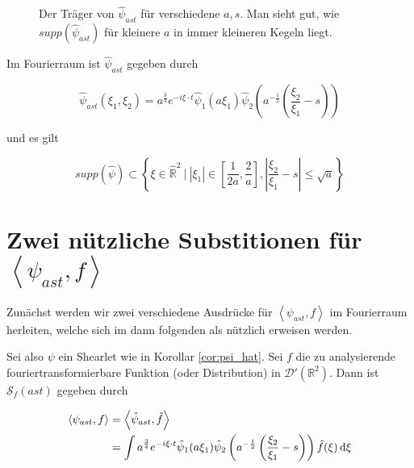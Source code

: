 \begin{remark}

\begin{figure}[h]
\centering

\label{fig:supp_psi_hat}
\caption{Der Träger von $\hat \psi_{ast}$ für verschiedene $a, s$. Man sieht gut,
wie $supp (\hat \psi_{ast})$ für kleinere $a$ in immer kleineren Kegeln liegt.}
\end{figure}

\label{cor:psi_hat}
Im Fourierraum ist $\hat{\psi}_{ast}$ gegeben durch

\begin{equation}
    \hat \psi_{ast}{(\xi_1, \xi_2)} = a^{\frac{3}{4}}e^{-i\xi \cdot t}\hat\psi_1(a \xi_1) \hat\psi_{2}\left(a^{-\frac{1}{2}}\left(\frac{\xi_2}{\xi_1}-s\right)\right)
\end{equation}

und es gilt

\begin{equation}
\label{eq:supp_psi}
    supp(\hat \psi) \subset \left\{\xi \in  \hat{\mathbb{R}}^2 ~\Big| ~|\xi_1| \in \left[\frac{1}{2 a} , \frac{2}{a}\right], \left|\frac{\xi_2}{\xi_1} - s\right| \leq \sqrt{a} \right\}
\end{equation}

\end{remark}





\section{\texorpdfstring{Zwei nützliche Substitionen für  $\left<\psi_{ast}, f\right>$}{zwei nützliche Substitutionen}}
\label{sec:substitutionen}

Zunächst werden wir zwei verschiedene Ausdrücke für $\left<\psi_{ast}, f\right>$
im Fourierraum herleiten, welche sich im dann folgenden als nützlich erweisen werden.

Sei also $\psi$ ein Shearlet wie in Korollar \ref{cor:psi_hat}. Sei $f$ die zu
analysierende fouriertransformierbare Funktion (oder Distribution) in
$\mathcal{D} \prime (\mathbb{R}^2)$. Dann ist $\mathcal{S}_f (ast)$ gegeben durch

\begin{align*}
\left< \psi_{ast}, f \right> &= \left<\hat\psi_{ast}, \hat f\right> \\
 &= \int a^{\frac{3}{4}} e^{-i \xi \cdot t} \hat \psi_1(a \xi_1)
    \hat \psi_2 \left(a^{-\frac{1}{2}} \left(\frac{\xi_2}{\xi_1} - s\right)\right)
    \hat f (\xi) \mathop{}\!\mathrm{d} \xi
\end{align*}

